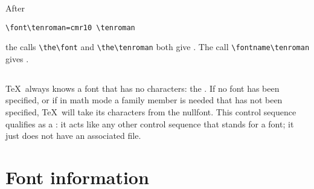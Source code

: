 \documentclass{book}
\begin{document}
\begin{example} After
\begin{verbatim}
\font\tenroman=cmr10 \tenroman
\end{verbatim}
the calls
\verb>\the\font> and \verb>\the\tenroman> both give .
The call \verb>\fontname\tenroman> gives .
\end{example}

\subsection{}

\TeX\ always knows a font that has no characters: the .
If no font has been specified, or if in math mode a family member
is needed that has not been specified,
\TeX\ will take its characters from the nullfont.
This control sequence qualifies as a :
it acts like any other control sequence that stands for a font;
it just does not have an associated  file.

\section{Font information}
\end{document}
